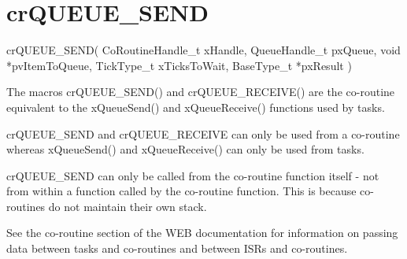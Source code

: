 \hypertarget{group__cr_q_u_e_u_e___s_e_n_d}{}\section{cr\+Q\+U\+E\+U\+E\+\_\+\+S\+E\+ND}
\label{group__cr_q_u_e_u_e___s_e_n_d}

\begin{DoxyPre}
crQUEUE\_SEND(
                 CoRoutineHandle\_t xHandle,
                 QueueHandle\_t pxQueue,
                 void *pvItemToQueue,
                 TickType\_t xTicksToWait,
                 BaseType\_t *pxResult
            )\end{DoxyPre}


The macro\textquotesingle{}s cr\+Q\+U\+E\+U\+E\+\_\+\+S\+E\+N\+D() and cr\+Q\+U\+E\+U\+E\+\_\+\+R\+E\+C\+E\+I\+V\+E() are the co-\/routine equivalent to the x\+Queue\+Send() and x\+Queue\+Receive() functions used by tasks.

cr\+Q\+U\+E\+U\+E\+\_\+\+S\+E\+ND and cr\+Q\+U\+E\+U\+E\+\_\+\+R\+E\+C\+E\+I\+VE can only be used from a co-\/routine whereas x\+Queue\+Send() and x\+Queue\+Receive() can only be used from tasks.

cr\+Q\+U\+E\+U\+E\+\_\+\+S\+E\+ND can only be called from the co-\/routine function itself -\/ not from within a function called by the co-\/routine function. This is because co-\/routines do not maintain their own stack.

See the co-\/routine section of the W\+EB documentation for information on passing data between tasks and co-\/routines and between I\+SR\textquotesingle{}s and co-\/routines.


